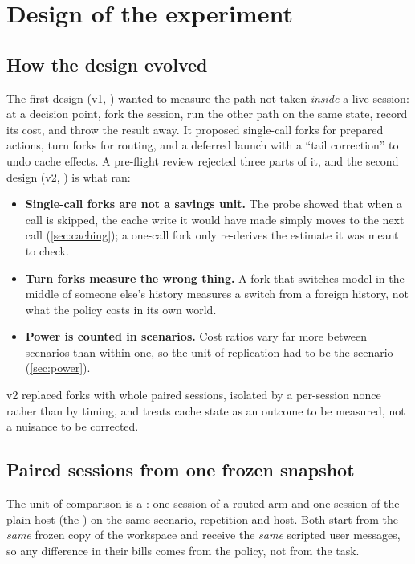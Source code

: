 \section{Design of the experiment}\label{sec:design}

\subsection{How the design evolved}\label{sec:evolution}

The first design (v1, ) wanted to measure the path not taken
\emph{inside} a live session: at a decision point, fork the session, run the other path on the same state, record
its cost, and throw the result away. It proposed single-call forks for prepared actions, turn forks for routing,
and a deferred launch with a ``tail correction'' to undo cache effects. A pre-flight review rejected three parts
of it, and the second design (v2, ) is what ran:
\begin{itemize}
  \item \textbf{Single-call forks are not a savings unit.} The probe showed that when a call is skipped, the cache
    write it would have made simply moves to the next call (\cref{sec:caching}); a one-call fork only re-derives
    the estimate it was meant to check.
  \item \textbf{Turn forks measure the wrong thing.} A fork that switches model in the middle of someone else's
    history measures a switch from a foreign history, not what the policy costs in its own world.
  \item \textbf{Power is counted in scenarios.} Cost ratios vary far more between scenarios than within one, so
    the unit of replication had to be the scenario (\cref{sec:power}).
\end{itemize}
v2 replaced forks with whole paired sessions, isolated by a per-session nonce rather than by timing, and treats
cache state as an outcome to be measured, not a nuisance to be corrected.

\subsection{Paired sessions from one frozen snapshot}

The unit of comparison is a : one session of a routed arm and one session of the plain host
(the ) on the same scenario, repetition and host. Both start from the \emph{same} frozen copy
of the workspace and receive the \emph{same} scripted user messages, so any difference in their bills
comes from the policy, not from the task.

